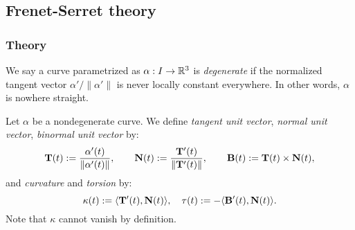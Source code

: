 \documentclass{../exp}
\def\a{\alpha}
\begin{document}
\subsection{Frenet-Serret theory}

\subsubsection{Theory}
\begin{defn}
We say a curve parametrized as $\a:I\to\R^3$ is \emph{degenerate} if the normalized tangent vector $\a'/\|\a'\|$ is never locally constant everywhere.
In other words, $\a$ is nowhere straight.
\end{defn}

\begin{defn}
Let $\a$ be a nondegenerate curve.
We define \emph{tangent unit vector}, \emph{normal unit vector}, \emph{binormal unit vector} by:
\[\bT(t):=\frac{\a'(t)}{\norm{\a'(t)}},\qquad\bN(t):=\frac{\bT'(t)}{\|\bT'(t)\|},\qquad\bB(t):=\bT(t)\times\bN(t),\]
and \emph{curvature} and \emph{torsion} by:
\[\kappa(t):=\langle\mathbf{T}'(t),\mathbf{N}(t)\rangle,\quad\tau(t):=-\langle\mathbf{B}'(t),\mathbf{N}(t)\rangle.\]
Note that $\kappa$ cannot vanish by definition.
\end{defn}
\end{document}
